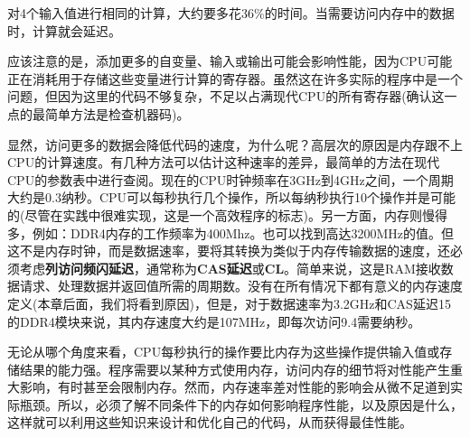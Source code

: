 对4个输入值进行相同的计算，大约要多花36\%的时间。当需要访问内存中的数据时，计算就会延迟。

应该注意的是，添加更多的自变量、输入或输出可能会影响性能，因为CPU可能正在消耗用于存储这些变量进行计算的寄存器。虽然这在许多实际的程序中是一个问题，但因为这里的代码不够复杂，不足以占满现代CPU的所有寄存器(确认这一点的最简单方法是检查机器码)。

显然，访问更多的数据会降低代码的速度，为什么呢？高层次的原因是内存跟不上CPU的计算速度。有几种方法可以估计这种速率的差异，最简单的方法在现代CPU的参数表中进行查阅。现在的CPU时钟频率在3GHz到4GHz之间，一个周期大约是0.3纳秒。CPU可以每秒执行几个操作，所以每纳秒执行10个操作并是可能的(尽管在实践中很难实现，这是一个高效程序的标志)。另一方面，内存则慢得多，例如：DDR4内存的工作频率为400Mhz。也可以找到高达3200MHz的值。但这不是内存时钟，而是数据速率，要将其转换为类似于内存传输数据的速度，还必须考虑\textbf{列访问频闪延迟}，通常称为\textbf{CAS延迟}或\textbf{CL}。简单来说，这是RAM接收数据请求、处理数据并返回值所需的周期数。没有在所有情况下都有意义的内存速度定义(本章后面，我们将看到原因)，但是，对于数据速率为3.2GHz和CAS延迟15的DDR4模块来说，其内存速度大约是107MHz，即每次访问9.4需要纳秒。

无论从哪个角度来看，CPU每秒执行的操作要比内存为这些操作提供输入值或存储结果的能力强。程序需要以某种方式使用内存，访问内存的细节将对性能产生重大影响，有时甚至会限制内存。然而，内存速率差对性能的影响会从微不足道到实际瓶颈。所以，必须了解不同条件下的内存如何影响程序性能，以及原因是什么，这样就可以利用这些知识来设计和优化自己的代码，从而获得最佳性能。








